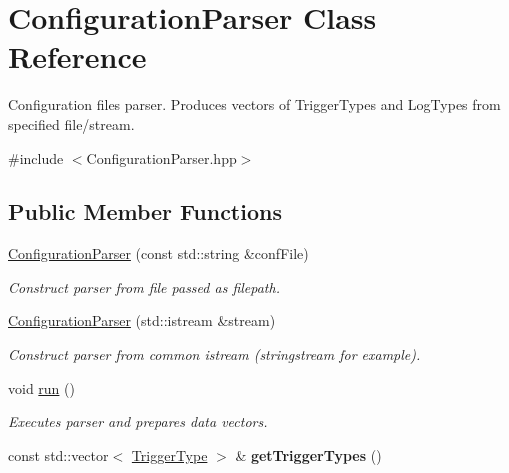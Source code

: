 \hypertarget{classConfigurationParser}{}\section{Configuration\+Parser Class Reference}
\label{classConfigurationParser}


Configuration files parser. Produces vectors of Trigger\+Types and Log\+Types from specified file/stream.  




{\ttfamily \#include $<$Configuration\+Parser.\+hpp$>$}

\subsection*{Public Member Functions}
\begin{DoxyCompactItemize}
\item 
\hyperlink{classConfigurationParser_a733451434951190d9af6cb51afed56cf}{Configuration\+Parser} (const std\+::string \&conf\+File)\hypertarget{classConfigurationParser_a733451434951190d9af6cb51afed56cf}{}\label{classConfigurationParser_a733451434951190d9af6cb51afed56cf}

\begin{DoxyCompactList}\small\item\em Construct parser from file passed as filepath. \end{DoxyCompactList}\item 
\hyperlink{classConfigurationParser_a8747f413fe8507a9900479d0d68d0c2c}{Configuration\+Parser} (std\+::istream \&stream)\hypertarget{classConfigurationParser_a8747f413fe8507a9900479d0d68d0c2c}{}\label{classConfigurationParser_a8747f413fe8507a9900479d0d68d0c2c}

\begin{DoxyCompactList}\small\item\em Construct parser from common istream (stringstream for example). \end{DoxyCompactList}\item 
void \hyperlink{classConfigurationParser_afe538cbe8fc07befb3c971bfdaf6f16e}{run} ()\hypertarget{classConfigurationParser_afe538cbe8fc07befb3c971bfdaf6f16e}{}\label{classConfigurationParser_afe538cbe8fc07befb3c971bfdaf6f16e}

\begin{DoxyCompactList}\small\item\em Executes parser and prepares data vectors. \end{DoxyCompactList}\item 
const std\+::vector$<$ \hyperlink{structTriggerType}{Trigger\+Type} $>$ \& {\bfseries get\+Trigger\+Types} ()\hypertarget{classConfigurationParser_abc1b068528b8d66630587acd3c74d1e2}{}\label{classConfigurationParser_abc1b068528b8d66630587acd3c74d1e2}


\end{DoxyCompactItemize}
